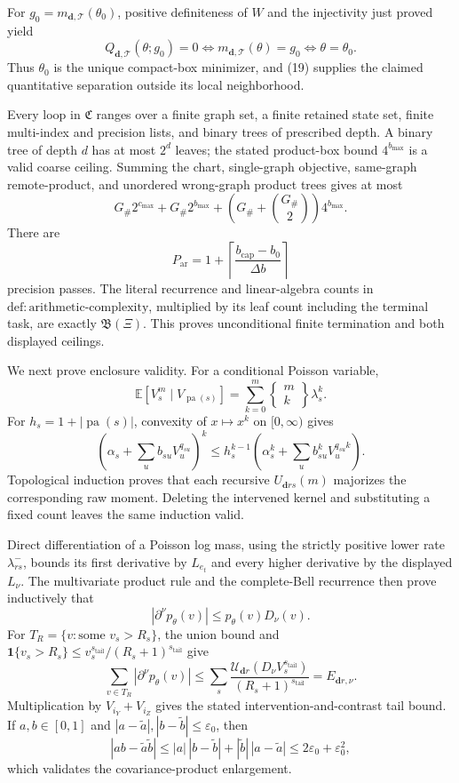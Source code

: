 For \(g_0=m_{\boldsymbol d,\mathcal T}(\theta_0)\), positive definiteness of \(W\) and the injectivity just proved yield
\[
 Q_{\boldsymbol d,\mathcal T}(\theta;g_0)=0
 \Longleftrightarrow
 m_{\boldsymbol d,\mathcal T}(\theta)=g_0
 \Longleftrightarrow \theta=\theta_0. \tag{20}
\]
Thus \(\theta_0\) is the unique compact-box minimizer, and (19) supplies the claimed quantitative separation outside its local neighborhood.

Every loop in \(\mathfrak C\) ranges over a finite graph set, a finite retained state set, finite multi-index and precision lists, and binary trees of prescribed depth.  A binary tree of depth \(d\) has at most \(2^d\) leaves; the stated product-box bound \(4^{b_{\max}}\) is a valid coarse ceiling.  Summing the chart, single-graph objective, same-graph remote-product, and unordered wrong-graph product trees gives at most
\[
 G_{\#}2^{c_{\max}}+G_{\#}2^{b_{\max}}
 +\left(G_{\#}+\binom{G_{\#}}2\right)4^{b_{\max}}. \tag{21}
\]
There are
\[
 P_{\mathrm{ar}}=1+
 \left\lceil\frac{b_{\mathrm{cap}}-b_0}{\Delta b}\right\rceil
\]
precision passes.  The literal recurrence and linear-algebra counts in \(\mathrm{def{:}arithmetic\text{-}complexity}\), multiplied by its leaf count including the terminal task, are exactly \(\mathfrak B(\Xi)\).  This proves unconditional finite termination and both displayed ceilings.

We next prove enclosure validity.  For a conditional Poisson variable,
\[
 \mathbb E[V_s^m\mid V_{\operatorname{pa}(s)}]
 =\sum_{k=0}^{m}
 \left\{\begin{matrix}m\\k\end{matrix}\right\}\lambda_s^k.
\]
For \(h_s=1+|\operatorname{pa}(s)|\), convexity of \(x\mapsto x^k\) on \([0,\infty)\) gives
\[
 \left(\alpha_s+\sum_u b_{su}V_u^{q_{su}}\right)^k
 \leq h_s^{k-1}
 \left(\alpha_s^k+
 \sum_u b_{su}^kV_u^{q_{su}k}\right). \tag{22}
\]
Topological induction proves that each recursive \(U_{\boldsymbol d rs}(m)\) majorizes the corresponding raw moment.  Deleting the intervened kernel and substituting a fixed count leaves the same induction valid.

Direct differentiation of a Poisson log mass, using the strictly positive lower rate \(\lambda^-_{rs}\), bounds its first derivative by \(L_{e_t}\) and every higher derivative by the displayed \(L_\nu\).  The multivariate product rule and the complete-Bell recurrence then prove inductively that
\[
 |\partial^\nu p_\theta(v)|\leq p_\theta(v)D_\nu(v). \tag{23}
\]
For \(T_R=\{v:\text{some }v_s>R_s\}\), the union bound and
\(\mathbf1\{v_s>R_s\}\leq v_s^{s_{\mathrm{tail}}}/(R_s+1)^{s_{\mathrm{tail}}}\) give
\[
 \sum_{v\in T_R}|\partial^\nu p_\theta(v)|
 \leq\sum_s
 \frac{\mathcal U_{\boldsymbol d r}(D_\nu V_s^{s_{\mathrm{tail}}})}
 {(R_s+1)^{s_{\mathrm{tail}}}}
 =E_{\boldsymbol d r,\nu}. \tag{24}
\]
Multiplication by \(V_{i_Y}+V_{i_Z}\) gives the stated intervention-and-contrast tail bound.  If \(a,b\in[0,1]\) and \(|a-\widetilde a|,|b-\widetilde b|\leq\varepsilon_0\), then
\[
 |ab-\widetilde a\widetilde b|
 \leq |a|\,|b-\widetilde b|+|\widetilde b|\,|a-\widetilde a|
 \leq2\varepsilon_0+\varepsilon_0^2, \tag{25}
\]
which validates the covariance-product enlargement.

